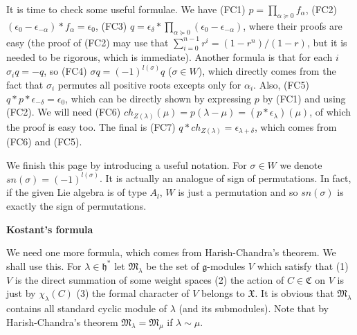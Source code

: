 \documentclass{article}
\newcommand{\lie}[1]{\mathfrak{#1}}
\begin{document}
It is time to check some useful formulae.
We have (FC1) $p = \prod_{\alpha \succeq 0} f_\alpha$, (FC2) $(\epsilon_0 - \epsilon_{-\alpha}) * f_\alpha = \epsilon_0$, (FC3) $q = \epsilon_\delta * \prod_{\alpha \succeq 0} (\epsilon_0 - \epsilon_{-\alpha})$, where their proofs are easy (the proof of (FC2) may use that $\sum_{i = 0}^{n - 1} r^i = (1 - r^n) / (1 - r)$, but it is needed to be rigorous, which is immediate).
Another formula is that for each $i$ $\sigma_i q = -q$, so (FC4) $\sigma q = (-1)^{l(\sigma)} q$ ($\sigma \in W$), which directly comes from the fact that $\sigma_i$ permutes all positive roots excepts only for $\alpha_i$.
Also, (FC5) $q * p * \epsilon_{-\delta} = \epsilon_0$, which can be directly shown by expressing $p$ by (FC1) and using (FC2).
We will need (FC6) $ch_{Z(\lambda)}(\mu) = p(\lambda - \mu) = (p * \epsilon_\lambda)(\mu)$, of which the proof is easy too.
The final is (FC7) $q * ch_{Z(\lambda)} = \epsilon_{\lambda + \delta}$, which comes from (FC6) and (FC5).

We finish this page by introducing a useful notation.
For $\sigma \in W$ we denote $sn(\sigma) = (-1)^{l(\sigma)}$.
It is actually an analogue of sign of permutations.
In fact, if the given Lie algebra is of type $A_l$, $W$ is just a permutation and so $sn(\sigma)$ is exactly the sign of permutations.

\newpage

\textbf{Kostant's formula}

We need one more formula, which comes from Harish-Chandra's theorem.
We shall use this.
For $\lambda \in \lie{h}^*$ let $\mathfrak{M}_\lambda$ be the set of $\lie{g}$-modules $V$ which satisfy that (1) $V$ is the direct summation of some weight spaces (2) the action of $C \in \mathfrak{C}$ on $V$ is just by $\chi_\lambda(C)$ (3) the formal character of $V$ belongs to $\mathfrak{X}$.
It is obvious that $\mathfrak{M}_\lambda$ contains all standard cyclic module of $\lambda$ (and its submodules).
Note that by Harish-Chandra's theorem $\mathfrak{M}_\lambda = \mathfrak{M}_\mu$ if $\lambda \sim \mu$.
\end{document}
